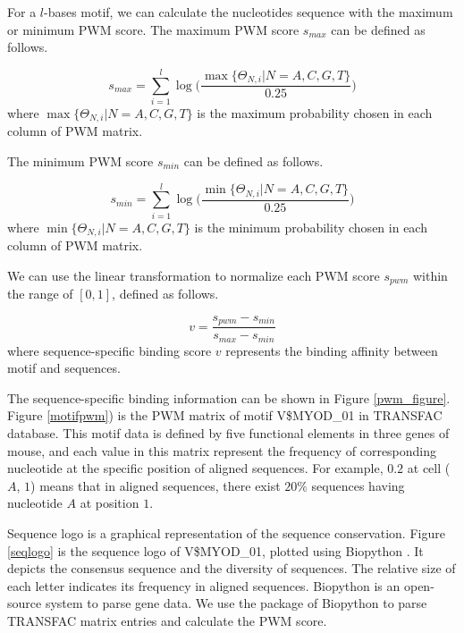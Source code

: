 \documentclass[journal,transmag]{IEEEtran}
\begin{document}
For a $l$-bases motif, we can calculate the nucleotides sequence
with the maximum or minimum PWM score. The maximum PWM score
$s_{max}$ can be defined as follows.

\begin{equation}
\label{pwm_max} s_{max} = \sum\limits_{i=1}^{l}
\log\Big(\frac{\max\{\Theta_{N,i} | N = A, C, G, T \}}{0.25}\Big)
\end{equation}
where $\max\{\Theta_{N,i} | N = A, C, G, T \}$ is the maximum
probability chosen in each column of PWM matrix.

The minimum PWM score $s_{min}$ can be defined as follows.

\begin{equation}
\label{pwm_min} s_{min} = \sum\limits_{i=1}^{l}
\log\Big(\frac{\min\{\Theta_{N,i} | N = A, C, G, T \}}{0.25}\Big)
\end{equation}
where $\min\{\Theta_{N,i} | N = A, C, G, T \}$ is the minimum
probability chosen in each column of PWM matrix.

We can use the linear transformation to normalize each PWM score
$s_{pwm}$ within the range of $[0,1]$, defined as follows.

\begin{equation}
\label{norm_pwm_equ} v = \frac{s_{pwm} - s_{min}}{s_{max} - s_{min}}
\end{equation}
where sequence-specific binding score $v$ represents the binding
affinity between motif and sequences.


The sequence-specific binding information can be shown in Figure
\ref{pwm_figure}. Figure \ref{motifpwm}) is the PWM matrix of motif
V\$MYOD\_01 in TRANSFAC database. This motif data is defined by five
functional elements in three genes of mouse, and each value in this
matrix represent the frequency of corresponding nucleotide at the
specific position of aligned sequences. For example, $0.2$ at cell
($A$, $1$) means that in aligned sequences, there exist $20\%$
sequences having nucleotide $A$ at position $1$.


Sequence logo \cite{mybibfile:seqlogo} is a graphical representation
of the sequence conservation. Figure \ref{seqlogo} is the sequence
logo of V\$MYOD\_01, plotted using Biopython
\cite{mybibfile:weblogo}. It depicts the consensus sequence and the
diversity of sequences. The relative size of each letter indicates
its frequency in aligned sequences. Biopython
\cite{mybibfile:biopython} is an open-source system to parse gene
data. We use the package of Biopython to parse TRANSFAC matrix
entries and calculate the PWM score.
\end{document}
